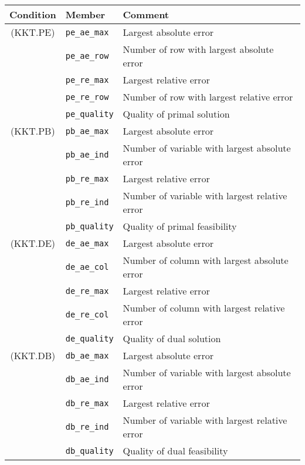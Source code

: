 \begin{table}[h]
\begin{center}
\begin{tabular}{@{}c|l|l@{}}
Condition & Member & Comment \\
\hline
(KKT.PE) & \verb|pe_ae_max| &
         Largest absolute error \\
         & \verb|pe_ae_row| &
         Number of row with largest absolute error \\
         & \verb|pe_re_max| &
         Largest relative error \\
         & \verb|pe_re_row| &
         Number of row with largest relative error \\
         & \verb|pe_quality| &
         Quality of primal solution \\
\hline
(KKT.PB) & \verb|pb_ae_max| &
         Largest absolute error \\
         & \verb|pb_ae_ind| &
         Number of variable with largest absolute error \\
         & \verb|pb_re_max| &
         Largest relative error \\
         & \verb|pb_re_ind| &
         Number of variable with largest relative error \\
         & \verb|pb_quality| &
         Quality of primal feasibility \\
\hline
(KKT.DE) & \verb|de_ae_max| &
         Largest absolute error \\
         & \verb|de_ae_col| &
         Number of column with largest absolute error \\
         & \verb|de_re_max| &
         Largest relative error \\
         & \verb|de_re_col| &
         Number of column with largest relative error \\
         & \verb|de_quality| &
         Quality of dual solution \\
\hline
(KKT.DB) & \verb|db_ae_max| &
         Largest absolute error \\
         & \verb|db_ae_ind| &
         Number of variable with largest absolute error \\
         & \verb|db_re_max| &
         Largest relative error \\
         & \verb|db_re_ind| &
         Number of variable with largest relative error \\
         & \verb|db_quality| &
         Quality of dual feasibility \\
\end{tabular}
\end{center}
\end{table}

